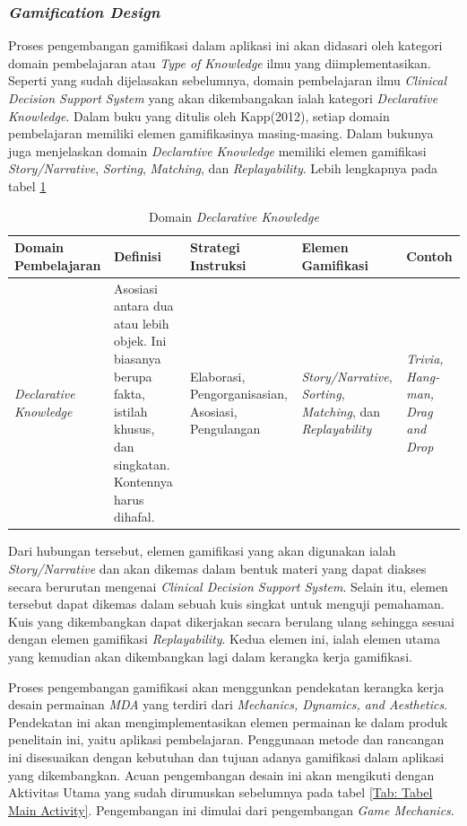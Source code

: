 \subsubsection{\textit{Gamification Design}}
Proses pengembangan gamifikasi dalam aplikasi ini akan didasari oleh kategori domain pembelajaran atau \textit{Type of Knowledge} ilmu yang diimplementasikan. Seperti yang sudah dijelasakan sebelumnya, domain pembelajaran ilmu \textit{Clinical Decision Support System} yang akan dikembangakan ialah kategori \textit{Declarative Knowledge}.
Dalam buku yang ditulis oleh Kapp(2012), setiap domain pembelajaran memiliki elemen gamifikasinya masing-masing. Dalam bukunya juga menjelaskan domain \textit{Declarative Knowledge} memiliki elemen gamifikasi \textit{Story/Narrative}, \textit{Sorting}, \textit{Matching}, dan \textit{Replayability}.
Lebih lengkapnya pada tabel \ref*{Tab:Declarative-knowledge}
\begin{table}[H]
	\centering
	\caption{Domain \textit{Declarative Knowledge}}
	\begin{tabular}{|p{2.7cm}|p{3cm}|p{2.7cm}|p{2.7cm}|p{2cm}|}
		\hline
		\centering\textbf{Domain Pembelajaran} &\centering\textbf{Definisi}  &\centering\textbf{Strategi Instruksi}  &\centering\textbf{Elemen Gamifikasi} &\multicolumn{1}{m{2cm}|}{\centering \textbf{Contoh}}\\
		\hline
		\textit{Declarative Knowledge} 
		&Asosiasi antara dua atau lebih objek. Ini biasanya berupa fakta, istilah khusus, dan singkatan. Kontennya harus dihafal.
		&Elaborasi, Pengorganisasian, Asosiasi, Pengulangan
		&\textit{Story/Narrative}, \textit{Sorting}, \textit{Matching}, dan \textit{Replayability}
		&\textit{Trivia, Hang-man, Drag and Drop} \\
		\hline
	\end{tabular}
	\label{Tab:Declarative-knowledge}
\end{table}
Dari hubungan tersebut, elemen gamifikasi yang akan digunakan ialah \textit{Story/Narrative} dan akan dikemas dalam bentuk materi yang dapat diakses secara berurutan mengenai \textit{Clinical Decision Support System}. Selain itu, elemen tersebut dapat dikemas dalam sebuah kuis singkat untuk menguji pemahaman.
Kuis yang dikembangkan dapat dikerjakan secara berulang ulang sehingga sesuai dengan elemen gamifikasi \textit{Replayability}. Kedua elemen ini, ialah elemen utama yang kemudian akan dikembangkan lagi dalam kerangka kerja gamifikasi.

Proses pengembangan gamifikasi akan menggunkan pendekatan kerangka kerja desain permainan \textit{MDA} yang terdiri dari \textit{Mechanics, Dynamics, and Aesthetics}. 
Pendekatan ini akan mengimplementasikan elemen permainan ke dalam produk penelitain ini, yaitu aplikasi pembelajaran.
Penggunaan metode dan rancangan ini disesuaikan dengan kebutuhan dan tujuan adanya gamifikasi dalam aplikasi yang dikembangkan.
Acuan pengembangan desain ini akan mengikuti dengan Aktivitas Utama yang sudah dirumuskan sebelumnya pada tabel \ref*{Tab: Tabel Main Activity}.
Pengembangan ini dimulai dari pengembangan \textit{Game Mechanics}.

